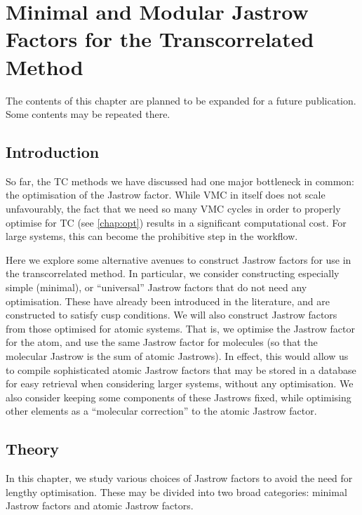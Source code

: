 \chapter{Minimal and Modular Jastrow Factors for the Transcorrelated Method}
\label{chap:universal}

The contents of this chapter are planned to be expanded for a future publication. Some contents may be repeated there.

\section{Introduction}

So far, the \gls{TC} methods we have discussed had one major bottleneck in common: the optimisation of the Jastrow factor. While VMC in itself does not scale unfavourably, the fact that we need so many VMC cycles in order to properly optimise for TC (see \autoref{chap:opt}) results in a significant computational cost. For large systems, this can become the prohibitive step in the workflow.

Here we explore some alternative avenues to construct Jastrow factors for use in the transcorrelated method. In particular, we consider constructing especially simple (minimal), or ``universal'' Jastrow factors that do not need any optimisation. These have already been introduced in the literature,\supercite{fournaisNonIsotropic2007,fournaisSharp2005,tewSecond2008,szenesStriking2024} and are constructed to satisfy cusp conditions. We will also construct Jastrow factors from those optimised for atomic systems. That is, we optimise the Jastrow factor for the atom, and use the same Jastrow factor for molecules (so that the molecular Jastrow is the sum of atomic Jastrows). In effect, this would allow us to compile sophisticated atomic Jastrow factors that may be stored in a database for easy retrieval when considering larger systems, without any optimisation. We also consider keeping some components of these Jastrows fixed, while optimising other elements as a ``molecular correction'' to the atomic Jastrow factor.

\section{Theory}

In this chapter, we study various choices of Jastrow factors to avoid the need for lengthy optimisation. These may be divided into two broad categories: minimal Jastrow factors and atomic Jastrow factors.

